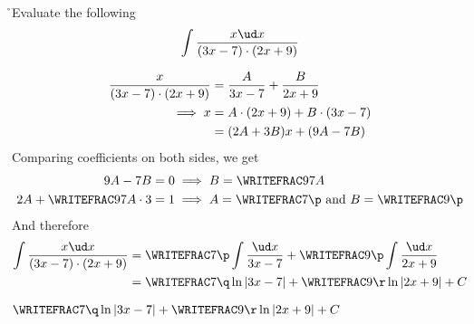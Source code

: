 


\EXPR[0]{\p}{(\vb * \vc) + (\vd * \va)}
\MULTIPLY\va\p\q
\MULTIPLY\vc\p\r

\question[3] Evaluate the following \[ \int\dfrac{x\ud x}{(\va x - \vb)\cdot (\vc x + \vd)} \]

\watchout

\begin{solution}[\halfpage]
  \begin{align}
    \dfrac{x}{(3 x - 7)\cdot (2 x + 9)} &= 
    \dfrac{A}{3 x - 7} + \dfrac{B}{2 x + 9} \\
    \implies x &= A\cdot (2 x + 9) + B\cdot (3 x - 7) \\
                &= (2 A + 3 B)x + (9 A - 7 B)
  \end{align}
  Comparing coefficients on both sides, we get 
  \begin{align}
    \vd A - \vb B &= 0 \implies B = \WRITEFRAC\vd\vb A \\
    \vc A + \WRITEFRAC\vd\vb A\cdot\va &= 1 
    \implies A = \WRITEFRAC\vb\p \text{ and } B = \WRITEFRAC\vd\p
  \end{align}
  And therefore
  \begin{align}
    \int\dfrac{x\ud x}{(\va x - \vb)\cdot (\vc x + \vd)} &= 
    \WRITEFRAC\vb\p\int\dfrac{\ud x}{\va x - \vb} + \WRITEFRAC\vd\p\int\dfrac{\ud x}{\vc x + \vd} \\
    &= \WRITEFRAC\vb\q\ln\vert\va x - \vb\vert + \WRITEFRAC\vd\r\ln\vert\vc x + \vd\vert + C
  \end{align}
\end{solution}

\ifprintanswers\begin{codex}
	$\WRITEFRAC\vb\q\ln\vert\va x - \vb\vert + \WRITEFRAC\vd\r\ln\vert\vc x + \vd\vert + C$
\end{codex}\fi
